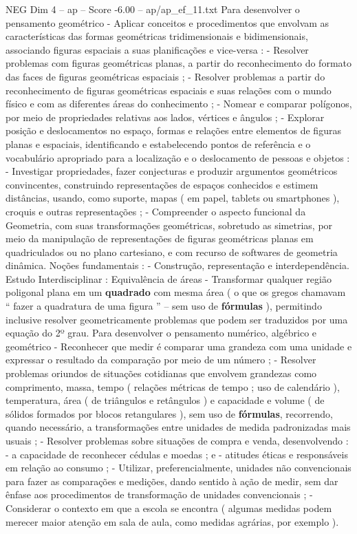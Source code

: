\begin{textsample}{NEG Dim 4 – ap – Score -6.00 – ap/ap\_ef\_11.txt}
Para desenvolver o pensamento geométrico - Aplicar conceitos e procedimentos que envolvam as características das formas geométricas tridimensionais e bidimensionais, associando figuras espaciais a suas planificações e vice-versa : - Resolver problemas com figuras geométricas planas, a partir do reconhecimento do formato das faces de figuras geométricas espaciais ; - Resolver problemas a partir do reconhecimento de figuras geométricas espaciais e suas relações com o mundo físico e com as diferentes áreas do conhecimento ; - Nomear e comparar polígonos, por meio de propriedades relativas aos lados, vértices e ângulos ; - Explorar posição e deslocamentos no espaço, formas e relações entre elementos de figuras planas e espaciais, identificando e estabelecendo pontos de referência e o vocabulário apropriado para a localização e o deslocamento de pessoas e objetos : - Investigar propriedades, fazer conjecturas e produzir argumentos geométricos convincentes, construindo representações de espaços conhecidos e estimem distâncias, usando, como suporte, mapas ( em papel, tablets ou smartphones ), croquis e outras representações ; - Compreender o aspecto funcional da Geometria, com suas transformações geométricas, sobretudo as simetrias, por meio da manipulação de representações de figuras geométricas planas em quadriculados ou no plano cartesiano, e com recurso de softwares de geometria dinâmica.
Noções fundamentais : - Construção, representação e interdependência.
Estudo Interdisciplinar : Equivalência de áreas - Transformar qualquer região poligonal plana em um \textbf{quadrado} com mesma área ( o que os gregos chamavam “ fazer a quadratura de uma figura ” – sem uso de \textbf{fórmulas} ), permitindo inclusive resolver geometricamente problemas que podem ser traduzidos por uma equação do 2º grau.
Para desenvolver o pensamento numérico, algébrico e geométrico - Reconhecer que medir é comparar uma grandeza com uma unidade e expressar o resultado da comparação por meio de um número ; - Resolver problemas oriundos de situações cotidianas que envolvem grandezas como comprimento, massa, tempo ( relações métricas de tempo ; uso de calendário ), temperatura, área ( de triângulos e retângulos ) e capacidade e volume ( de sólidos formados por blocos retangulares ), sem uso de \textbf{fórmulas}, recorrendo, quando necessário, a transformações entre unidades de medida padronizadas mais usuais ; - Resolver problemas sobre situações de compra e venda, desenvolvendo : - a capacidade de reconhecer cédulas e moedas ; e - atitudes éticas e responsáveis em relação ao consumo ; - Utilizar, preferencialmente, unidades não convencionais para fazer as comparações e medições, dando sentido à ação de medir, sem dar ênfase aos procedimentos de transformação de unidades convencionais ; - Considerar o contexto em que a escola se encontra ( algumas medidas podem merecer maior atenção em sala de aula, como medidas agrárias, por exemplo ).

\end{textsample}

